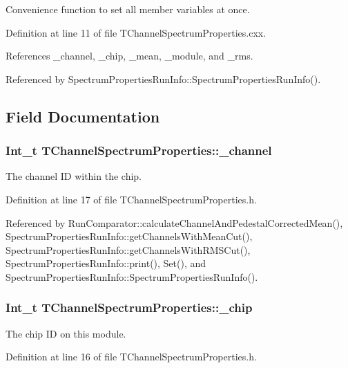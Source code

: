 Convenience function to set all member variables at once. 

Definition at line 11 of file TChannelSpectrumProperties.cxx.

References \_\-channel, \_\-chip, \_\-mean, \_\-module, and \_\-rms.

Referenced by SpectrumPropertiesRunInfo::SpectrumPropertiesRunInfo().

\subsection{Field Documentation}
\hypertarget{class_t_channel_spectrum_properties_a6bfd5e0b63e55aed4d1816a722f5c2e7}{
\subsubsection[{\_\-channel}]{\setlength{\rightskip}{0pt plus 5cm}Int\_\-t {\bf TChannelSpectrumProperties::\_\-channel}}}
\label{class_t_channel_spectrum_properties_a6bfd5e0b63e55aed4d1816a722f5c2e7}


The channel ID within the chip. 

Definition at line 17 of file TChannelSpectrumProperties.h.

Referenced by RunComparator::calculateChannelAndPedestalCorrectedMean(), SpectrumPropertiesRunInfo::getChannelsWithMeanCut(), SpectrumPropertiesRunInfo::getChannelsWithRMSCut(), SpectrumPropertiesRunInfo::print(), Set(), and SpectrumPropertiesRunInfo::SpectrumPropertiesRunInfo().\hypertarget{class_t_channel_spectrum_properties_afdfd4c52a9b23cd7cd76dda75b595e27}{
\subsubsection[{\_\-chip}]{\setlength{\rightskip}{0pt plus 5cm}Int\_\-t {\bf TChannelSpectrumProperties::\_\-chip}}}
\label{class_t_channel_spectrum_properties_afdfd4c52a9b23cd7cd76dda75b595e27}


The chip ID on this module. 

Definition at line 16 of file TChannelSpectrumProperties.h.

